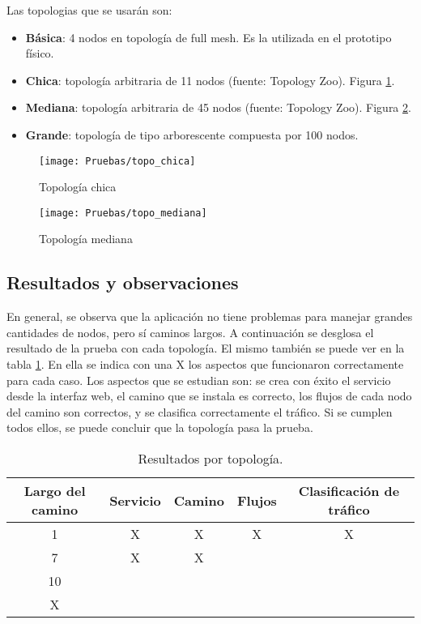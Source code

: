 Las topologias que se usarán son:
\begin{itemize}
	\item \textbf{Básica}: 4 nodos en topología de full mesh. Es la utilizada en el prototipo físico.
	\item \textbf{Chica}: topología arbitraria de 11 nodos (fuente: Topology Zoo). Figura \ref{fig:topo_chica}.
	\item \textbf{Mediana}: topología arbitraria de 45 nodos (fuente: Topology Zoo). Figura \ref{fig:topo_mediana}.
	\item \textbf{Grande}: topología de tipo arborescente compuesta por 100 nodos.
\end{itemize}

\begin{figure}[t]
\caption{Topología chica}
\texttt{[image: Pruebas/topo\_chica]}
\centering
\label{fig:topo_chica}
\end{figure}

\begin{figure}[t]
\caption{Topología mediana}
\texttt{[image: Pruebas/topo\_mediana]}
\centering
\label{fig:topo_mediana}
\end{figure}

\subsection{Resultados y observaciones}
En general, se observa que la aplicación no tiene problemas para manejar grandes cantidades de nodos, pero sí caminos largos. A continuación se desglosa el resultado de la prueba con cada topología. El mismo también se puede ver en la tabla \ref{table:problemas_por_topologia}. En ella se indica con una X los aspectos que funcionaron correctamente para cada caso. Los aspectos que se estudian son: se crea con éxito el servicio desde la interfaz web, el camino que se instala es correcto, los flujos de cada nodo del camino son correctos, y se clasifica correctamente el tráfico. Si se cumplen todos ellos, se puede concluir que la topología pasa la prueba.

\begin{table}[ht]
\caption{Resultados por topología.}
\centering 
\begin{tabular}{c c c c c}
\hline\hline
Largo del camino & Servicio & Camino & Flujos  & Clasificación de tráfico \\ [0.5ex]
\hline
1 & X & X & X & X \\
7 & X & X &  &  \\
10 &  &  &  &  \\
X &  &  &  &  \\ [1ex]
\hline
\end{tabular}
\label{table:problemas_por_topologia}
\end{table}

